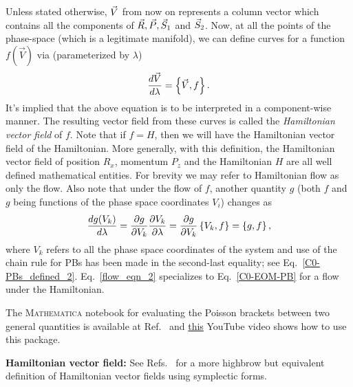 Unless stated otherwise, $\vec{V}$ from now on represents a column vector 
which contains all the components of $\vec{R}, \vec{P}, \vec{S}_1$ and $\vec{S}_2$.
Now, at all the points of the phase-space (which is a legitimate manifold),
we can define curves for a function $f(\vec{V})$ via (parameterized by $\lambda$)
\begin{align}
\frac{d \vec{V}}{d \lambda}   =  \left\lbrace \vec{V},  f \right\rbrace  .       \label{H-flow}
\end{align}
It's implied that the above equation is to
 be interpreted in a component-wise manner.
The resulting vector field from these curves is called the 
\textit{Hamiltonian vector field} of $f$. Note that if $f = H$, then we will
have the Hamiltonian vector field of the 
Hamiltonian. More generally, with this definition, 
the Hamiltonian vector field of position 
$R_x$, momentum $P_z$ and the Hamiltonian $H$
are all well defined mathematical entities. 
For brevity we may refer to 
Hamiltonian flow as only the flow. 
Also note that under the flow of $f$, another quantity 
$g$ (both $f$ and $g$ being functions of the
phase space coordinates $V_i$) changes as
\begin{align}           \label{flow_eqn_2}
\frac{d g(V_k)}{d \lambda} =  \frac{\partial g}{\partial V_k} \frac{\partial V_k}{\partial \lambda}=           
\frac{\partial g}{\partial V_k}    \left\lbrace V_k, f \right\rbrace   = \left\lbrace g, f \right\rbrace    , 
\end{align}
where $V_k$ refers to all the phase space coordinates of the system
and use of the chain rule for PBs has been made in the second-last equality; see
Eq.~\eqref{C0-PBs_defined_2}.
Eq.~\eqref{flow_eqn_2}   
specializes to Eq.~\eqref{C0-EOM-PB} for a flow under the Hamiltonian.






The \textsc{Mathematica} notebook for evaluating the Poisson 
brackets between two general quantities 
is available at Ref.~\cite{MMA1} and 
\href{https://youtu.be/aoiCk5TtmvE}{this} YouTube video 
shows how to use this package.




\hfill \break


\begin{definition}[label=def:BB]
\textbf{Hamiltonian vector field:}
See Refs.~\cite{jose, arnold} for a more highbrow but
equivalent definition of Hamiltonian vector fields
using symplectic forms.
\end{definition}

\hfill \break




